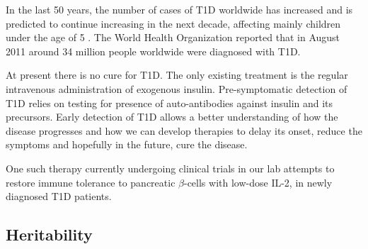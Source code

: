 In the last 50 years, the number of cases of T1D worldwide has increased and is predicted to continue increasing in the next decade,
affecting mainly children under the age of 5 \citep{Patterson:2009gj}.
The World Health Organization reported that in August 2011 around 34 million people worldwide were diagnosed with T1D.

At present there is no cure for \gls{T1D}.
The only existing treatment is the regular intravenous administration of exogenous insulin.  
Pre-symptomatic detection of T1D relies on testing for presence of auto-antibodies against insulin and its precursors.
Early detection of T1D allows a better understanding of how the disease progresses and how we can develop therapies to delay its onset,
reduce the symptoms and hopefully in the future, cure the disease.  

One such therapy currently undergoing clinical trials in our lab attempts to restore immune tolerance to pancreatic $\beta$-cells with low-dose \Gls{IL-2},
in newly diagnosed \gls{T1D} patients.


\subsection{Heritability}


